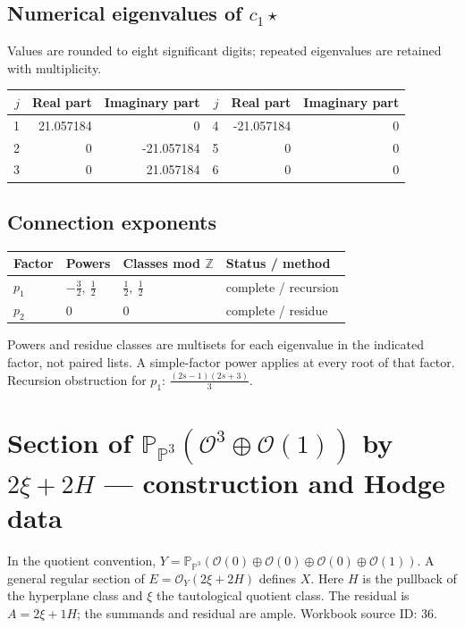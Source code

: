 \documentclass[10pt,a4paper]{article}
\begin{document}
\subsection*{Numerical eigenvalues of $c_1\star$}
Values are rounded to eight significant digits; repeated eigenvalues are retained with multiplicity.
\begin{center}\small\begin{tabular}{rrr@{\qquad}rrr}\toprule $j$ & Real part & Imaginary part & $j$ & Real part & Imaginary part\\\midrule
1 & 21.057184 & 0 & 4 & -21.057184 & 0\\
2 & 0 & -21.057184 & 5 & 0 & 0\\
3 & 0 & 21.057184 & 6 & 0 & 0\\
\bottomrule\end{tabular}\end{center}
\subsection*{Connection exponents}
\begin{center}\begin{tabular}{llll}\toprule Factor & Powers & Classes mod $\mathbb Z$ & Status / method\\\midrule
$p_{1}$ & $- \frac{3}{2},\ \frac{1}{2}$ & $\frac{1}{2},\ \frac{1}{2}$ & complete / recursion\\
$p_{2}$ & $0$ & $0$ & complete / residue\\
\bottomrule\end{tabular}\end{center}
Powers and residue classes are multisets for each eigenvalue in the indicated factor, not paired lists. A simple-factor power applies at every root of that factor.
Recursion obstruction for $p_{1}$: $\frac{\left(2 s - 1\right) \left(2 s + 3\right)}{3}$.
\clearpage\section*{Section of $\mathbb P_{\mathbb P^{3}}(\mathcal O^{3}\oplus \mathcal O(1))$ by $2\xi +2H$ --- construction and Hodge data}\label{entry:PB5-036}
In the quotient convention, $Y=\mathbb P_{\mathbb P^{3}}(\mathcal O(0)\oplus\mathcal O(0)\oplus\mathcal O(0)\oplus\mathcal O(1))$.
A general regular section of $E=\mathcal O_Y(2\xi+2H)$ defines $X$.
Here $H$ is the pullback of the hyperplane class and $\xi$ the tautological quotient class. The residual is $A=2\xi+1H$; the summands and residual are ample.
Workbook source ID: 36.
\end{document}
